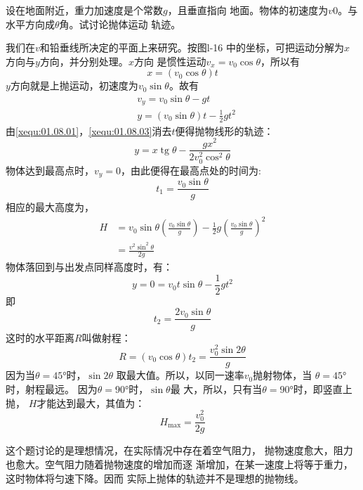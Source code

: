 \example 设在地面附近，重力加速度是个常数$g$，且垂直指向
地面。物体的初速度为$ v0 $。与水平方向成$ \theta $角。试讨论抛体运动
轨迹。

\discussion 我们在$ v $和铅垂线所决定的平面上来研究。按图l-16
中的坐标，可把运动分解为$ x $方向与$ y $方向，并分别处理。$ x $方向
是惯性运动$ v_x=v_0\cos\theta $，所以有
\begin{equation*}\label{xequ:01.08.01}
    x=(v_0\cos\theta)t \tag{1}
\end{equation*}
$ y $方向就是上抛运动，初速度为$ v_0\sin\theta$。故有
\begin{align*}
\label{xequ:01.08.02} &v_y=v_0\sin\theta-gt \tag{2} \\
\label{xequ:01.08.03} &y=(v_0\sin\theta)t-\frac{1}{2}gt^2 \tag{3}
\end{align*}
由\eqref{xequ:01.08.01}，\eqref{xequ:01.08.03}消去$ t $便得抛物线形的轨迹：
\begin{equation*}\label{xequ:01.08.04}
    y=x \operatorname{tg} \theta-\frac{g x^{2}}{2 v_{0}^{2} \cos ^{2} \theta} \tag{4}
\end{equation*}
物体达到最高点时，$ v_y=0 $，由此便得在最高点处的时间为:
\begin{equation*}
    t_{1}=\frac{v_{0} \sin \theta}{g}
\end{equation*}
相应的最大高度为，
\begin{equation*}
    \begin{aligned}
        H &=v_{0} \sin \theta\left(\frac{v_{0} \sin \theta}{g}\right)-\frac{1}{2} g\left(\frac{v_{0} \sin \theta}{g}\right)^{2} \\
        &=\frac{v^{2} \sin ^{2} \theta}{2 g}
    \end{aligned}
\end{equation*}
物体落回到与出发点同样高度时，有：
\begin{equation*}
    y=0=v_{0} t \sin \theta-\frac{1}{2} g t^{2}
\end{equation*}
即\vspace{-1em}
\begin{equation*}
    t_{2}=\frac{2 v_{0} \sin \theta}{g}
\end{equation*}
这时的水平距离$R$叫做射程：
\begin{equation*}
    R=\left(v_{0} \cos \theta\right) t_{2}=\frac{v_{0}^{2} \sin 2 \theta}{g}
\end{equation*}
因为当$\theta=\ang{45;;}$时，$\sin2\theta$
取最大值。所以，以同一速率$v_0$抛射物体，当
$\theta=\ang{45;;}$时，射程最远。
因为$\theta=\ang{90;;}$时，$\sin\theta$最
大，所以，只有当$\theta=\ang{90;;}$时，即竖直上抛，
$H$才能达到最大，其值为：
\begin{equation*}
    H_{\max }=\frac{v_{0}^{2}}{2 g}
\end{equation*}

这个题讨论的是理想情况，在实际情况中存在着空气阻力，
抛物速度愈大，阻力也愈大。空气阻力随着抛物速度的增加而逐
渐增加，在某一速度上将等于重力，这时物体将匀速下降。因而
实际上抛体的轨迹并不是理想的抛物线。
